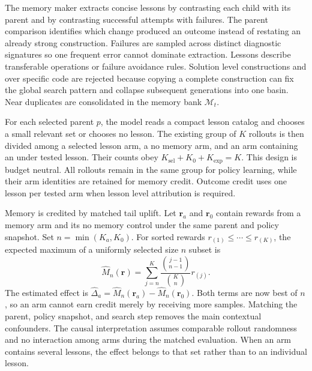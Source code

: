 \documentclass{article}
\newcommand{\Mem}{\mathcal{M}}
\begin{document}
The memory maker extracts concise lessons by contrasting each child with its parent and by contrasting successful attempts with failures. The parent comparison identifies which change produced an outcome instead of restating an already strong construction. Failures are sampled across distinct diagnostic signatures so one frequent error cannot dominate extraction. Lessons describe transferable operations or failure avoidance rules. Solution level constructions and over specific code are rejected because copying a complete construction can fix the global search pattern and collapse subsequent generations into one basin. Near duplicates are consolidated in the memory bank $\Mem_t$.

For each selected parent $p$, the model reads a compact lesson catalog and chooses a small relevant set or chooses no lesson. The existing group of $K$ rollouts is then divided among a selected lesson arm, a no memory arm, and an arm containing an under tested lesson. Their counts obey $K_{\mathrm{sel}}+K_0+K_{\mathrm{exp}}=K$. This design is budget neutral. All rollouts remain in the same group for policy learning, while their arm identities are retained for memory credit. Outcome credit uses one lesson per tested arm when lesson level attribution is required.

Memory is credited by matched tail uplift. Let $\mathbf r_a$ and $\mathbf r_0$ contain rewards from a memory arm and its no memory control under the same parent and policy snapshot. Set $n=\min(K_a,K_0)$. For sorted rewards $r_{(1)}\leq\cdots\leq r_{(K)}$, the expected maximum of a uniformly selected size $n$ subset is
\begin{equation}
\widehat M_n(\mathbf r)
=
\sum_{j=n}^{K}
\frac{\binom{j-1}{n-1}}{\binom{K}{n}}
r_{(j)}.
\label{eqsubsamplemax}
\end{equation}
The estimated effect is $\widehat\Delta_a=\widehat M_n(\mathbf r_a)-\widehat M_n(\mathbf r_0)$. Both terms are now best of $n$, so an arm cannot earn credit merely by receiving more samples. Matching the parent, policy snapshot, and search step removes the main contextual confounders. The causal interpretation assumes comparable rollout randomness and no interaction among arms during the matched evaluation. When an arm contains several lessons, the effect belongs to that set rather than to an individual lesson.
\end{document}
